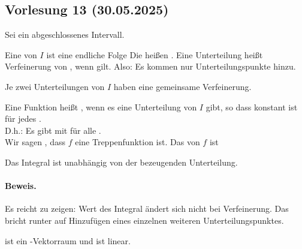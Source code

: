 \documentclass[9pt]{article} %
\begin{document}
\subsection{Vorlesung 13 (30.05.2025)}
Sei  ein abgeschlossenes Intervall. 
\begin{defi}
Eine  von $I$ ist eine endliche Folge 
Die  heißen . Eine Unterteilung 
 heißt Verfeinerung von , wenn  gilt. Also: Es kommen nur Unterteilungspunkte hinzu. 
\end{defi}
\begin{beob}
Je zwei Unterteilungen von $I$ haben eine gemeinsame Verfeinerung.  
\end{beob}
\begin{defi}
Eine Funktion  heißt , wenn es eine Unterteilung  von $I$ gibt, so dass  konstant ist für jedes . \\
D.h.: Es gibt  mit  für alle . \\
Wir sagen  , dass $f$ eine Treppenfunktion ist. Das  von $f$ ist   \\
\end{defi}
\begin{beob}
Das Integral ist unabhängig von der bezeugenden Unterteilung. 
\paragraph{Beweis.} Es reicht zu zeigen: Wert des Integral ändert sich nicht bei Verfeinerung. Das bricht runter auf Hinzufügen eines einzelnen weiteren Unterteilungspunktes. 
\end{beob}
\begin{bem}
 ist ein \ma{\R}-Vektorraum und  ist linear. 
\end{bem}
\end{document}
